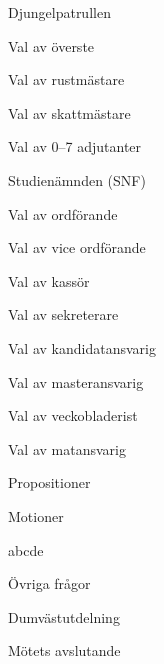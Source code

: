 \documentclass{sektionsmote}
\begin{document}
\begin{ootd}
\begin{ootd}
\begin{ootd}
    \end{ootd}
    \item Djungelpatrullen
    \begin{ootd}
        \item Val av överste
        \item Val av rustmästare
        \item Val av skattmästare
        \item Val av 0--7 adjutanter
    \end{ootd}
    \item Studienämnden (SNF)
    \begin{ootd}
        \item Val av ordförande
        \item Val av vice ordförande
        \item Val av kassör
        \item Val av sekreterare
        \item Val av kandidatansvarig
        \item Val av masteransvarig
        \item Val av veckobladerist
        \item Val av matansvarig
    \end{ootd}
\end{ootd}

\item{Propositioner}

\item{Motioner}
\begin{ootd}
    \item abcde
\end{ootd}

\item{Övriga frågor}

\item{Dumvästutdelning}

\item{Mötets avslutande}
\end{ootd}


\begin{bilagor}


\end{bilagor}
\end{document}
